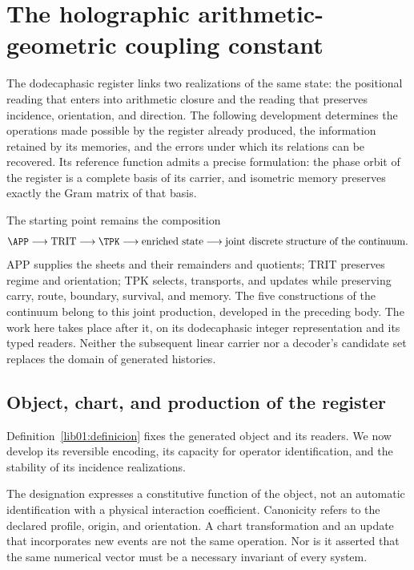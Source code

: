 \section{The holographic arithmetic-geometric coupling constant}
\label{lib01:acoplamiento}

The dodecaphasic register links two realizations of the same state: the positional reading that enters into arithmetic closure and the reading that preserves incidence, orientation, and direction. The following development determines the operations made possible by the register already produced, the information retained by its memories, and the errors under which its relations can be recovered.
Its reference function admits a precise formulation: the phase orbit of the register is a complete basis of its carrier, and isometric memory preserves exactly the Gram matrix of that basis.

The starting point remains the composition
\[
 \APP\longrightarrow\mathrm{TRIT}\longrightarrow\TPK
 \longrightarrow\text{enriched state}
 \longrightarrow\text{joint discrete structure of the continuum}.
\]
APP supplies the sheets and their remainders and quotients; TRIT preserves regime and orientation; TPK selects, transports, and updates while preserving carry, route, boundary, survival, and memory. The five constructions of the continuum belong to this joint production, developed in the preceding body. The work here takes place after it, on its dodecaphasic integer representation and its typed readers. Neither the subsequent linear carrier nor a decoder's candidate set replaces the domain of generated histories.

\subsection{Object, chart, and production of the register}
\label{lib01:registro}

Definition~\ref{lib01:definicion} fixes the generated object and its readers. We now develop its reversible encoding, its capacity for operator identification, and the stability of its incidence realizations.

The designation expresses a constitutive function of the object, not an automatic identification with a physical interaction coefficient. Canonicity refers to the declared profile, origin, and orientation. A chart transformation and an update that incorporates new events are not the same operation. Nor is it asserted that the same numerical vector must be a necessary invariant of every system.

